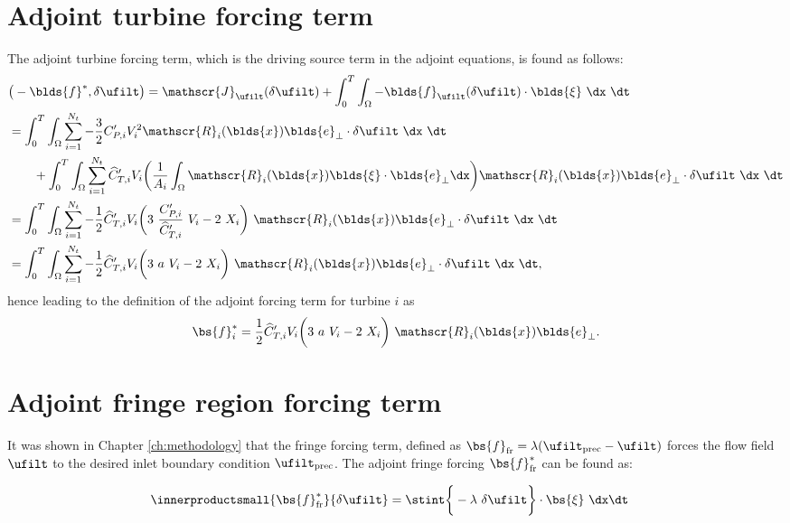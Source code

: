 \section{Adjoint turbine forcing term}
The adjoint turbine forcing term, which is the driving source term in the adjoint equations, is found as follows:
\begin{align}
&\big( -\blds{f}^*, \delta \ufilt \big) = \mathscr{J}_{\ufilt} (\delta \ufilt) + \int_{0}^{T} \int_\Omega -\blds{f}_{\ufilt} (\delta \ufilt) \cdot \blds{\xi}~\dx~\dt\\
&= \int_{0}^{T} \int_{\Omega} \sum_{i=1}^{N_t} -\frac{3}{2} C_{P,i}' V_{i}^2 \mathscr{R}_i (\blds{x}) \blds{e}_\perp \cdot \delta \ufilt~\dx~\dt \nonumber \\
& \qquad + \int_{0}^{T} \int_{\Omega} \sum_{i=1}^{N_t} \widehat{C}_{T,i}' V_{i} \bigg( \frac{1}{A_i} \int_{\Omega} \mathscr{R}_i(\blds{x}) \blds{\xi} \cdot \blds{e}_\perp \dx  \bigg) \mathscr{R}_i (\blds{x}) \blds{e}_\perp \cdot \delta \ufilt ~\dx~\dt\\
&= \int_{0}^{T} \int_{\Omega} \sum_{i=1}^{N_t} -\frac{1}{2} \widehat{C}_{T,i}' V_{i} \bigg(3~\frac{C_{P,i}'}{\widehat{C}_{T,i}'}~V_{i} - 2~X_{i} \bigg)~\mathscr{R}_i (\blds{x}) \blds{e}_\perp \cdot \delta \ufilt ~\dx~\dt\\
&= \int_{0}^{T} \int_{\Omega} \sum_{i=1}^{N_t} -\frac{1}{2} \widehat{C}_{T,i}' V_{i} \bigg(3~a~V_{i} - 2~X_{i} \bigg)~\mathscr{R}_i (\blds{x}) \blds{e}_\perp \cdot \delta \ufilt ~\dx~\dt,
\end{align}
hence leading to the definition of the adjoint forcing term for turbine $i$ as 
\begin{equation}
	\bs{f}_i^* = \frac{1}{2} \widehat{C}_{T,i}' V_{i} \bigg(3~a~V_{i} - 2~X_{i} \bigg)~\mathscr{R}_i (\blds{x}) \blds{e}_\perp.
\end{equation}

\section{Adjoint fringe region forcing term}
It was shown in Chapter \ref{ch:methodology} that the fringe forcing term, defined as $\bs{f}_{\text{fr}} = \lambda (\ufilt_{\text{prec}} - \ufilt)$ forces the flow field $\ufilt$ to the desired inlet boundary condition $\ufilt_{\text{prec}}$. The adjoint fringe forcing $\bs{f}_{\text{fr}}^*$ can be found as:

\begin{align}
	\innerproductsmall{\bs{f}_{\text{fr}}^*}{\delta \ufilt} &= \stint \bigg\{ -\lambda \ \delta \ufilt\bigg\}\cdot \bs{\xi}~ \dx \dt
\end{align}

